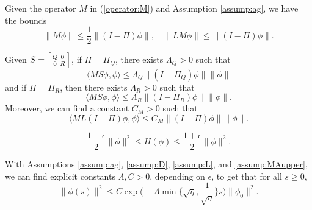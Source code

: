 \documentclass[10pt,a4paper]{amsart}
\begin{document}
\begin{lemma}\label{lem:bounds}
    Given the operator $M$ in (\ref{operator:M}) and Assumption \ref{assump:ag}, we have the bounds
    \begin{equation}
         \|M\phi\|\leq \frac{1}{2}\|(I-\Pi)\phi\|,\quad \|LM\phi\|\leq\|(I-\Pi)\phi\|.
    \end{equation}
\end{lemma}

\begin{assumption}\label{assump:MAupper}
 Given $S = \Bigl[\begin{smallmatrix}
            Q & 0\\
            0 &  R
        \end{smallmatrix}\Bigr]$, if $\Pi=\Pi_Q$, there exists $\Lambda_Q>0$ such that      
        \begin{equation}
           \langle M S\phi, \phi\rangle\leq \Lambda_Q\|(I-\Pi_Q)\phi\|\|\phi\|
        \end{equation}
 and if $\Pi=\Pi_R$, then there exists $\Lambda_R>0$ such that
        \begin{equation}
          \langle M S\phi, \phi\rangle\leq  \Lambda_R\|(I-\Pi_R)\phi\|\|\phi\|.
        \end{equation}
        Moreover, we can find a constant $C_M>0$ such that 
     \begin{equation}
              \langle M L(I-\Pi)\phi, \phi\rangle\leq C_M \|(I-\Pi)\phi\|\|\phi\|.
     \end{equation}
\end{assumption}

\begin{equation}\label{eqn:normequiv}
   \frac{1-\epsilon}{2}\|\phi\|^2\leq  H(\phi)\leq \frac{1+\epsilon}{2}\|\phi\|^2.
\end{equation}

\begin{thm}\label{thm:hypocoercivity}
With Assumptions \ref{assump:ag}, \ref{assump:D}, \ref{assump:L}, and \ref{assump:MAupper}, we can find explicit constants $\Lambda, C>0$, depending on $\epsilon$,  to get that for all $s \geq 0$,
\begin{equation}
    \|\phi(s)\|^2 \leq C \exp\Big(-\Lambda \min\Big\{\sqrt{\eta}, \frac{1}{\sqrt{\eta}}\Big\} s \Big)\|\phi_0\|^2.
\end{equation}
\end{thm}
\end{document}

